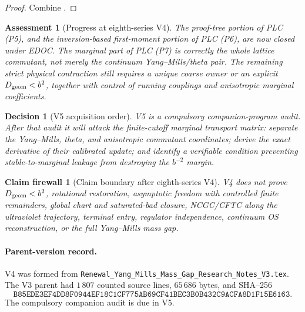\documentclass[11pt,oneside]{book}
\newtheorem{assessment}[theorem]{Assessment}
\newtheorem{firewall}[theorem]{Claim firewall}
\newtheorem{decision}[theorem]{Decision}
\theoremstyle{definition}
\theoremstyle{remark}
\begin{document}
\begin{proof}
Combine
.
\end{proof}

\begin{assessment}[Progress at eighth-series V4]
\label{ass:e8v4-status}
The proof-tree portion of PLC (P5), and the inversion-based
first-moment portion of PLC (P6), are now closed under EDOC.  The
marginal part of PLC (P7) is correctly the whole lattice commutant,
not merely the continuum Yang--Mills/theta pair.  The remaining
strict physical contraction still requires a unique coarse owner or
an explicit \(D_{\rm geom}<b^2\), together with control of running
couplings and anisotropic marginal coefficients.
\end{assessment}

\begin{decision}[V5 acquisition order]
\label{dec:e8v4-V5}
V5 is a compulsory companion-program audit.  After that audit it will
attack the finite-cutoff marginal transport matrix: separate the
Yang--Mills, theta, and anisotropic commutant coordinates; derive the
exact derivative of their calibrated update; and identify a
verifiable condition preventing stable-to-marginal leakage from
destroying the \(b^{-2}\) margin.
\end{decision}

\begin{firewall}[Claim boundary after eighth-series V4]
\label{fire:e8v4-claim}
V4 does not prove \(D_{\rm geom}<b^2\), rotational restoration,
asymptotic freedom with controlled finite remainders, global chart
and saturated-bad closure, NCGC/CFTC along the ultraviolet
trajectory, terminal entry, regulator independence, continuum OS
reconstruction, or the full Yang--Mills mass gap.
\end{firewall}

\paragraph{Parent-version record.}
V4 was formed from
\texttt{Renewal\_Yang\_Mills\_Mass\_Gap\_Research\_Notes\_V3.tex}.
The V3 parent had \(1\,807\) counted source lines,
\(65\,686\) bytes, and SHA--256
\[
 \texttt{B85EDE3EF4DD8F0944EF18C1CF775AB69CF41BEC3B0B432C9ACFA8D1F15E6163}.
\]
The compulsory companion audit is due in V5.

\end{document}

